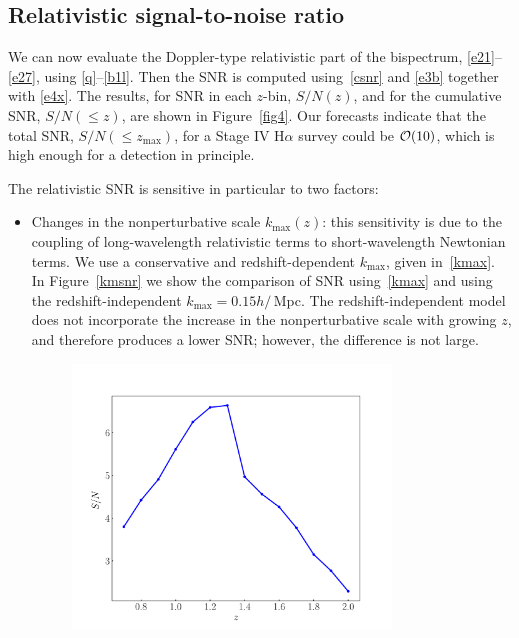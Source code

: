 \subsection{Relativistic signal-to-noise ratio}
%
%
We can now evaluate the Doppler-type relativistic part of the bispectrum, \eqref{e21}--\eqref{e27}, using \eqref{q}--\eqref{b1l}. 
Then the SNR is computed using~\eqref{csnr}  and \eqref{e3b} together with \eqref{e4x}.
The results, for SNR in each $z$-bin, $S/N(z)$, and for the cumulative SNR, $S/N(\leq z)$, are shown in Figure~\ref{fig4}.
Our forecasts indicate that the total SNR, $S/N(\leq z_{\mathrm{max}})$, for a Stage IV H$\alpha$  survey could be ${\cal O}(10)$, which  is high enough for a detection in principle.

The relativistic SNR is sensitive in particular to two factors:
\begin{itemize}
\item 
Changes in the nonperturbative scale  $k_{\mathrm{max}}(z)$: this sensitivity is due to the coupling of long-wavelength relativistic terms to short-wavelength Newtonian terms. 
We use a conservative and redshift-dependent $k_{\mathrm{max}}$, given in~\eqref{kmax}. In  Figure~\ref{kmsnr}
we show the comparison of SNR using~\eqref{kmax} and using the redshift-independent $k_{\mathrm{max}}=0.15h/\,$Mpc. The redshift-independent model does not incorporate  the increase in the nonperturbative scale with growing $z$, and therefore produces a lower SNR; however, the difference is not large.
\begin{figure}[!ht]
\centering
\includegraphics[width=0.8\textwidth]{fig/snrDoppler-eps-converted-to}

\end{figure}
\end{itemize}

